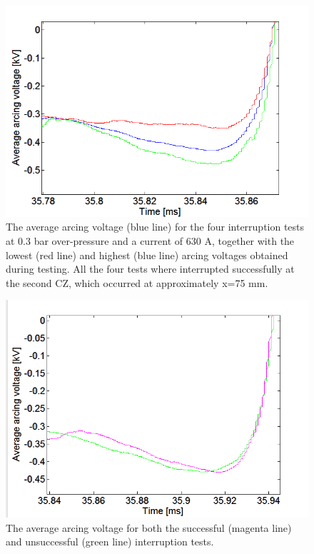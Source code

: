 \documentclass[10pt,b5paper,twoside]{article}
\begin{document}
\begin{figure}[H]
\centering
\includegraphics[scale=0.6, angle =0 ]{Bilder/Results/ArcingVoltage_75_none_reIgnition_average.png}
\caption{The average arcing voltage (blue line) for the four interruption tests at 0.3 bar over-pressure and a current of 630 A, together with the lowest (red line) and highest (blue line) arcing voltages obtained during testing. All the four tests where interrupted successfully at the second CZ, which occurred at approximately  x=75 mm.} \label{fig:75mmSuccessful_ave}
\end{figure}

\begin{figure}[H]
\centering
\includegraphics[scale=0.6, angle =0 ]{Bilder/Results/ArcingVoltage_75_both_average.png}
\caption{The average arcing voltage for both the successful (magenta line) and unsuccessful (green line) interruption tests.} \label{fig:75mm_both_ave}
\end{figure}
\end{document}
